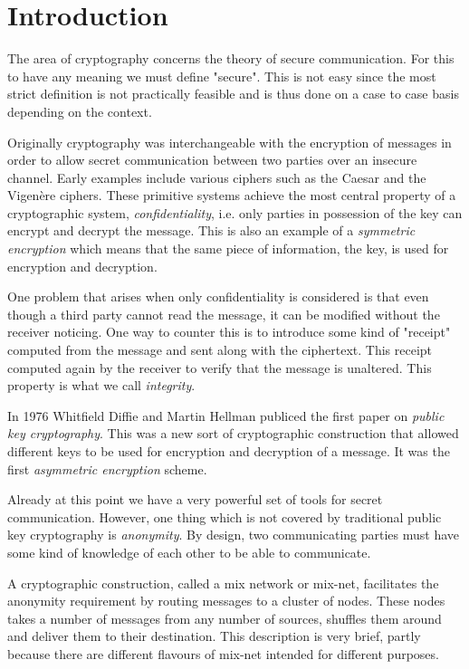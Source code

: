 \section{Introduction}



The area of cryptography concerns the theory of secure
communication. For this to have any meaning we must define
"secure". This is not easy since the most strict definition is not
practically feasible and is thus done on a case to case basis
depending on the context.

Originally cryptography was interchangeable with the encryption of
messages in order to allow secret communication between two parties
over an insecure channel. Early examples include various ciphers such
as the Caesar and the Vigenère ciphers. These primitive systems
achieve the most central property of a cryptographic system,
\emph{confidentiality}, i.e. only parties in possession of the key can
encrypt and decrypt the message. This is also an example of a
\emph{symmetric encryption} which means that the same piece of
information, the key, is used for encryption and decryption.

One problem that arises when only confidentiality is considered is
that even though a third party cannot read the message, it can be
modified without the receiver noticing. One way to counter this is to
introduce some kind of "receipt" computed from the message and sent
along with the ciphertext. This receipt computed again by the receiver
to verify that the message is unaltered. This property is what we call
\emph{integrity}.

In 1976 Whitfield Diffie and Martin Hellman publiced the first paper
on \emph{public key cryptography}. This was a new sort of
cryptographic construction that allowed different keys to be used for
encryption and decryption of a message. It was the first
\emph{asymmetric encryption} scheme.

Already at this point we have a very powerful set of tools for secret
communication. However, one thing which is not covered by traditional
public key cryptography is \emph{anonymity}. By design, two
communicating parties must have some kind of knowledge of each other
to be able to communicate. 

A cryptographic construction, called a mix network or mix-net,
facilitates the anonymity requirement by routing messages to a cluster
of nodes. These nodes takes a number of messages from any number of
sources, shuffles them around and deliver them to their
destination. This description is very brief, partly because there are
different flavours of mix-net intended for different purposes.

